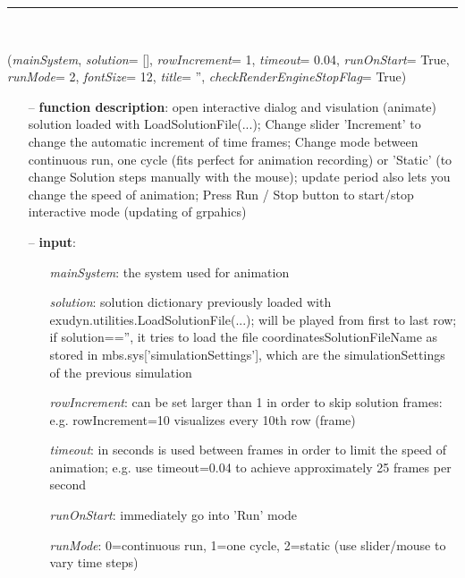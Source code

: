 \begin{itemize}[leftmargin=1.4cm]
\begin{itemize}[leftmargin=1.4cm]
\begin{itemize}[leftmargin=0.5cm]
\begin{itemize}[leftmargin=1.4cm]
\begin{itemize}[leftmargin=1.4cm]
\begin{itemize}[leftmargin=0.5cm]
\begin{itemize}[leftmargin=1.4cm]
\begin{itemize}[leftmargin=0.5cm]
\begin{itemize}[leftmargin=1.4cm]
\begin{itemize}[leftmargin=1.4cm]
%
\noindent\rule{8cm}{0.75pt}\vspace{1pt} \\ 
\begin{flushleft}
\label{sec:interactive:SolutionViewer}
({\it mainSystem}, {\it solution}= [], {\it rowIncrement}= 1, {\it timeout}= 0.04, {\it runOnStart}= True, {\it runMode}= 2, {\it fontSize}= 12, {\it title}= '', {\it checkRenderEngineStopFlag}= True)
\end{flushleft}
\setlength{\itemindent}{0.7cm}
\begin{itemize}[leftmargin=0.7cm]
  \item[--]  {\bf function description}: open interactive dialog and visulation (animate) solution loaded with LoadSolutionFile(...); Change slider 'Increment' to change the automatic increment of time frames; Change mode between continuous run, one cycle (fits perfect for animation recording) or 'Static' (to change Solution steps manually with the mouse); update period also lets you change the speed of animation; Press Run / Stop button to start/stop interactive mode (updating of grpahics)  \item[--]  {\bf input}: \vspace{-6pt}
  \begin{itemize}[leftmargin=1.2cm]
\setlength{\itemindent}{-0.7cm}
    \item[] {\it mainSystem}: the system used for animation
    \item[] {\it   solution}: solution dictionary previously loaded with exudyn.utilities.LoadSolutionFile(...); will be played from first to last row; if solution=='', it tries to load the file coordinatesSolutionFileName as stored in mbs.sys['simulationSettings'], which are the simulationSettings of the previous simulation
    \item[] {\it   rowIncrement}: can be set larger than 1 in order to skip solution frames: e.g. rowIncrement=10 visualizes every 10th row (frame)
    \item[] {\it   timeout}: in seconds is used between frames in order to limit the speed of animation; e.g. use timeout=0.04 to achieve approximately 25 frames per second
    \item[] {\it   runOnStart}: immediately go into 'Run' mode
    \item[] {\it   runMode}: 0=continuous run, 1=one cycle, 2=static (use slider/mouse to vary time steps)

\end{itemize}
\end{itemize}
\end{itemize}
\end{itemize}
\end{itemize}
\end{itemize}
\end{itemize}
\end{itemize}
\end{itemize}
\end{itemize}
\end{itemize}
\end{itemize}
